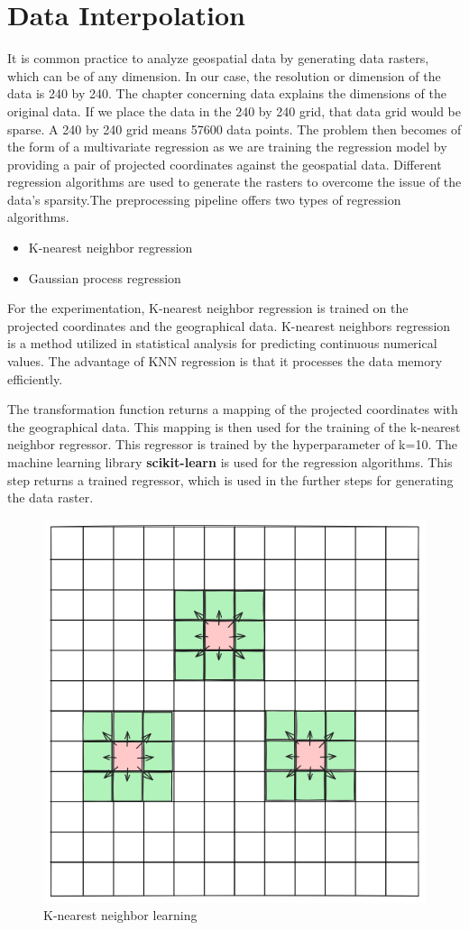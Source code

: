 \section{Data Interpolation }
It is common practice to analyze geospatial data by generating data rasters, which can be of any dimension. In our case, the resolution or dimension of the data is 240 by 240. The chapter concerning data explains the dimensions of the original data. If we place the data in the 240 by 240 grid, that data grid would be sparse. A 240 by 240 grid means 57600 data points. The problem then becomes of the form of a multivariate regression as we are training the regression model by providing a pair of projected coordinates against the geospatial data. Different regression algorithms are used to generate the rasters to overcome the issue of the data's sparsity.The preprocessing pipeline offers two types of regression algorithms.

\begin{itemize}
    \item K-nearest neighbor regression
    \item Gaussian process regression
\end{itemize}
For the experimentation, K-nearest neighbor regression is trained on the projected coordinates and the geographical data. K-nearest neighbors regression is a method utilized in statistical analysis for predicting continuous numerical values. The advantage of KNN regression is that it processes the data memory efficiently.

The transformation function returns a mapping of the projected coordinates with the geographical data.
This mapping is then used for the training of the k-nearest neighbor regressor. This regressor is trained by the hyperparameter of k=10. The machine learning library \textbf{scikit-learn} \cite{scikit-learn} is used for the regression algorithms.
This step returns a trained regressor, which is used in the further steps for generating the data raster.
\begin{figure}[h]
    \centering
    \includegraphics[width=0.5\linewidth]{figures/chapter-7/raster_interpolation.png}
    \caption{K-nearest neighbor learning}
    \label{fig:knn-learning}
\end{figure}

